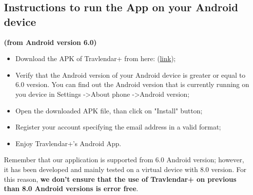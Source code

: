 \subsection{Instructions to run the App on your Android device}
\label{subsect:Android device Instructions}
\textbf{(from Android version 6.0)}
\begin{itemize}
	\item Download the APK of Travlendar+ from here: (\href{https://github.com/JustSalva/MelziPinaSalvadore/tree/master/DeliveryFolder/InstallationFolder/travlendarPlus.apk}{\color{blue}link});
	\item Verify that the Android version of your Android device is greater or equal to 6.0 version. You can find out the Android version that is currently running on you device in Settings -\textgreater  About phone -\textgreater  Android version;
	\item Open the downloaded APK file, than click on "Install" button;
	\item Register your account specifying the email address in a valid format;
	\item Enjoy Travlendar+'s Android App.	\\
\end{itemize}
Remember that our application is supported from 6.0 Android version; however, it has been developed and mainly tested on a virtual device with 8.0 version. For this reason, \textbf{we don't ensure that the use of Travlendar+ on previous than 8.0 Android versions is error free}.